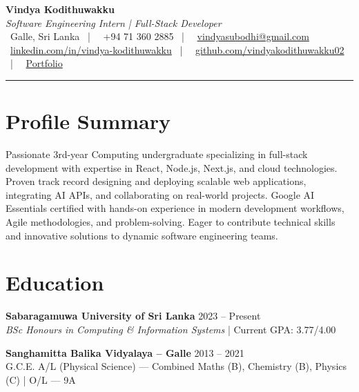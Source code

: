 \documentclass[letterpaper,10pt]{article}
\begin{document}
\begin{center}
{\Huge\color{accentTitle}\textbf{Vindya Kodithuwakku}}\\[3pt]
{\large\textit{Software Engineering Intern | Full-Stack Developer}}\\[4pt]
\faMapMarker*~Galle, Sri Lanka ~|~
\faPhone~+94 71 360 2885 ~|~
\faEnvelope~\href{mailto:vindyasubodhi@gmail.com}{vindyasubodhi@gmail.com}\\[1pt]
\faLinkedin~\href{https://www.linkedin.com/in/vindya-kodithuwakku-bb6187202}{linkedin.com/in/vindya-kodithuwakku} ~|~
\faGithub~\href{https://github.com/vindyakodithuwakku02}{github.com/vindyakodithuwakku02} ~|~
\faGlobe~\href{https://vindyakodithuwakku.github.io/portfolio}{Portfolio}\\[4pt]
{\color{accentLine}\hrule}
\end{center}

\section{Profile Summary}
\vspace{-1pt}
Passionate 3rd-year Computing undergraduate specializing in full-stack development with expertise in React, Node.js, Next.js, and cloud technologies. Proven track record designing and deploying scalable web applications, integrating AI APIs, and collaborating on real-world projects. Google AI Essentials certified with hands-on experience in modern development workflows, Agile methodologies, and problem-solving. Eager to contribute technical skills and innovative solutions to dynamic software engineering teams.

\section{Education}
\vspace{-1pt}

\textbf{Sabaragamuwa University of Sri Lanka} \hfill 2023 – Present\\
\textit{BSc Honours in Computing \& Information Systems} | Current GPA: 3.77/4.00

\vspace{2pt}
\textbf{Sanghamitta Balika Vidyalaya – Galle} \hfill 2013 – 2021\\
G.C.E. A/L (Physical Science) — Combined Maths (B), Chemistry (B), Physics (C) | O/L — 9A
\end{document}
